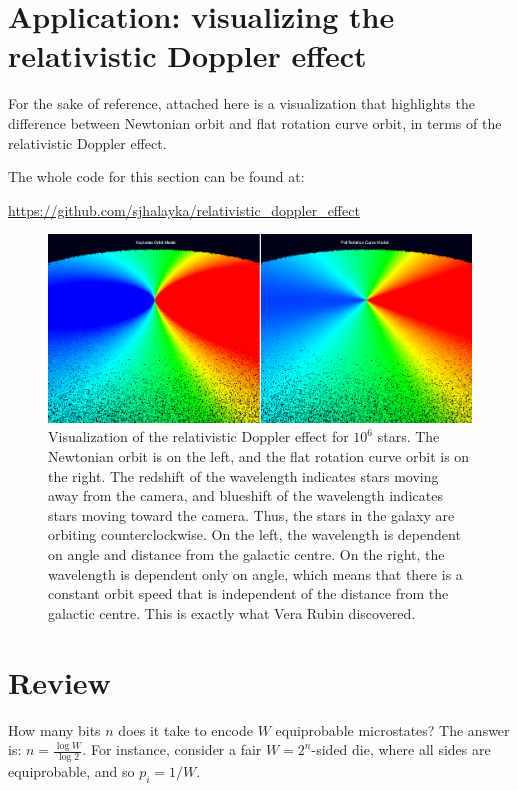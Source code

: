 \documentclass[12pt]{article}
\begin{document}
\section{Application: visualizing the relativistic Doppler effect}
For the sake of reference, attached here is a visualization that highlights the difference between Newtonian orbit and flat rotation curve orbit, in terms of the relativistic Doppler effect.

The whole code for this section can be found at:

\url{https://github.com/sjhalayka/relativistic_doppler_effect}

\begin{figure} 
\centering
\label{fig5}
  \includegraphics[width = 7 in]{doppler.png}
  \caption{
Visualization of the relativistic Doppler effect for $10^6$ stars.
The Newtonian orbit is on the left, and the flat rotation curve orbit is on the right.
The redshift of the wavelength indicates stars moving away from the camera, and blueshift of the wavelength indicates stars moving toward the camera.
Thus, the stars in the galaxy are orbiting counterclockwise.
On the left, the wavelength is dependent on angle and distance from the galactic centre.
On the right, the wavelength is dependent only on angle, which means that there is a constant orbit speed that is independent of the distance from the galactic centre.
This is exactly what Vera Rubin discovered.
}
\end{figure}




\section{Review}

How many bits $n$ does it take to encode $W$ equiprobable microstates?
The answer is: $n = \frac{\log W}{\log 2}$.
For instance, consider a fair $W = 2^n$-sided die, where all sides are equiprobable, and so $p_i = 1/W$.
\end{document}
